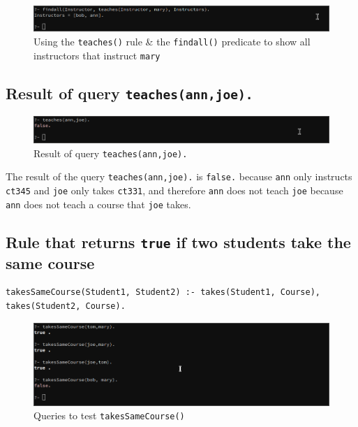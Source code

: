 \documentclass[a4paper]{article}
\begin{document}
\begin{figure}[H]
    \includegraphics[width=\textwidth]{./images/q1_3_findall.png}
    \caption{Using the \texttt{teaches()} rule \& the \texttt{findall()} predicate to show all instructors that instruct \texttt{mary}}
\end{figure}

\subsection{Result of query \texttt{teaches(ann,joe).}}
\begin{figure}[H]
    \includegraphics[width=\textwidth]{./images/q1_4.png}
    \caption{Result of query \texttt{teaches(ann,joe).}}
\end{figure}

The result of the query \texttt{teaches(ann,joe).} is \texttt{false.} because \texttt{ann}
only instructs \texttt{ct345} and \texttt{joe} only takes \texttt{ct331}, and therefore 
\texttt{ann} does not teach \texttt{joe} because \texttt{ann} does not teach a course
that \texttt{joe} takes.

\subsection{Rule that returns \texttt{true} if two students take the same course}
\begin{verbatim}
takesSameCourse(Student1, Student2) :- takes(Student1, Course), takes(Student2, Course).
\end{verbatim}

\begin{figure}[H]
    \includegraphics[width=\textwidth]{./images/q1_5.png}
    \caption{Queries to test \texttt{takesSameCourse()}}
\end{figure}
\end{document}
